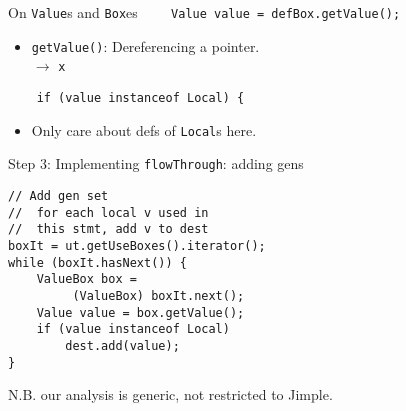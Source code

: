 \begin{slide}{On {\tt Value}s and {\tt Box}es}
{\red \verb+    Value value = defBox.getValue();+}

\begin{itemize}
\item {\tt getValue()}: Dereferencing a pointer.\\
\qquad \qquad \qquad \qquad {} $\to$ {\tt x}
\end{itemize}

{\red \verb+    if (value instanceof Local) {+}

\begin{itemize}
\item Only care about defs of {\tt Local}s here.
\end{itemize}
\end{slide}

\begin{slide}{Step 3: Implementing {\tt flowThrough}: adding gens}
\vspace*{-0.2in}
\begin{verbatim}
// Add gen set
//  for each local v used in 
//  this stmt, add v to dest
boxIt = ut.getUseBoxes().iterator();
while (boxIt.hasNext()) {
    ValueBox box = 
         (ValueBox) boxIt.next();
    Value value = box.getValue();
    if (value instanceof Local)
        dest.add(value);
}
\end{verbatim}

\vspace*{0.05in}

N.B. our analysis is generic, not restricted to Jimple.
\end{slide}

